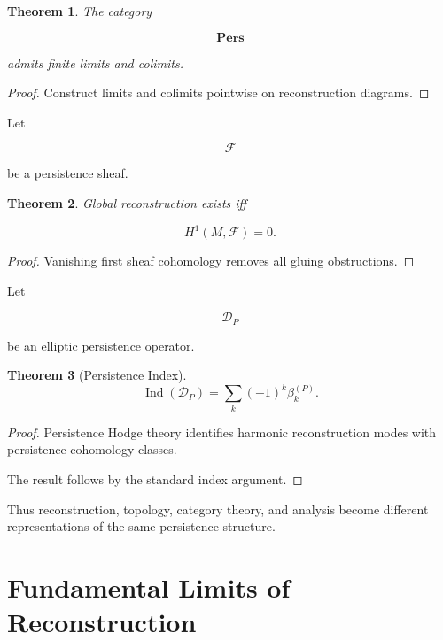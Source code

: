 \documentclass[12pt,oneside]{article}
\newtheorem{theorem}{Theorem}[section] \newtheorem{lemma}[theorem]{Lemma} \newtheorem{proposition}[theorem]{Proposition} \newtheorem{corollary}[theorem]{Corollary}
\theoremstyle{definition}
\begin{document}
\begin{theorem}

The category

\[
\mathbf{Pers}
\]

admits finite limits and colimits.

\end{theorem}

\begin{proof}

Construct limits and colimits pointwise on reconstruction diagrams.

\end{proof}

Let

\[
\mathcal F
\]

be a persistence sheaf.

\begin{theorem}

Global reconstruction exists iff

\[
H^1(M,\mathcal F)=0.
\]

\end{theorem}

\begin{proof}

Vanishing first sheaf cohomology removes all gluing obstructions.

\end{proof}

Let

\[
\mathcal D_P
\]

be an elliptic persistence operator.

\begin{theorem}[Persistence Index]

\[
\operatorname{Ind}(\mathcal D_P)
=
\sum_k
(-1)^k
\beta_k^{(P)}.
\]

\end{theorem}

\begin{proof}

Persistence Hodge theory identifies harmonic reconstruction modes with persistence cohomology classes.

The result follows by the standard index argument.

\end{proof}

Thus reconstruction, topology, category theory, and analysis become different representations of the same persistence structure.

\section{Fundamental Limits of Reconstruction}
\end{document}
